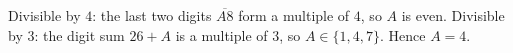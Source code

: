 Divisible by $4$: the last two digits $\overline{A8}$ form a multiple of $4$, so $A$ is even. Divisible by $3$: the digit sum $26+A$ is a multiple of $3$, so $A\in\{1,4,7\}$. Hence $A=\boxed{4}$.
